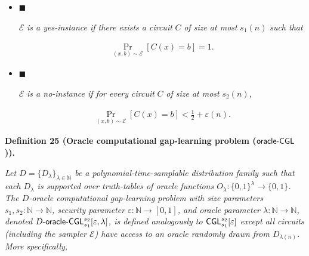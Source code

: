 \documentclass[10pt,a4paper]{article}
\begin{document}
\begin{itemize}


\item[] 
$\blacksquare$ 


$\mathcal{E}$\emph{ is a yes-instance if there exists a circuit }$C$\emph{ of size at most }$s_{1}(n)$\emph{ such that}\par


\[\begin{gathered}
\Pr_{(x,b)\sim\mathcal{E}}\left[C(x)=b\right]=1.
\end{gathered}\]





\item[] 
$\blacksquare$ 


$\mathcal{E}$\emph{ is a no-instance if for every circuit }$C$\emph{ of size at most }$s_{2}(n)$\emph{,}\par


\[\begin{gathered}
\Pr_{(x,b)\sim\mathcal{E}}\left[C(x)=b\right]<\frac{1}{2}+\varepsilon(n).
\end{gathered}\]





\end{itemize}







\par\medskip\noindent\textbf{
\textbf{Definition 25}\textbf{ }(Oracle computational gap-learning problem (${\sf oracle}\text{-}{\sf CGL}$))\textbf{.}
}\par



\emph{Let $D=\{D_{\lambda}\}_{\lambda\in\mathbb{N}}$ be a polynomial-time-samplable distribution family such that each $D_{\lambda}$ is supported over truth-tables of oracle functions $O_{\lambda}:\{0,1\}^{\lambda}\to\{0,1\}$. The $D$-oracle computational gap-learning problem with size parameters $s_{1},s_{2}:\mathbb{N}\to\mathbb{N}$, security parameter $\varepsilon:\mathbb{N}\to[0,1]$, and oracle parameter $\lambda:\mathbb{N}\to\mathbb{N}$, denoted $D\text{-}{\sf oracle}\text{-}{\sf CGL}_{s_{1}}^{s_{2}}[\varepsilon,\lambda]$, is defined analogously to ${\sf CGL}^{s_{2}}_{s_{1}}[\varepsilon]$ except all circuits (including the sampler $\mathcal{E}$) have access to an oracle randomly drawn from $D_{\lambda(n)}$. More specifically,}\par
\end{document}
